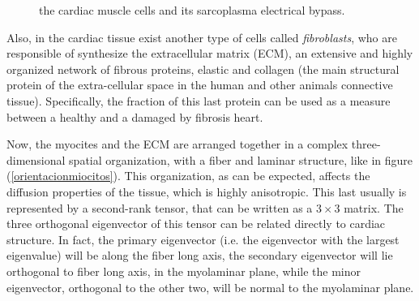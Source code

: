 \documentclass[letterpaper, twoside]{article}     	    %
\begin{document}
\begin{figure}[H]
\centering
{}
\caption{the cardiac muscle cells and its sarcoplasma electrical bypass.} 
\end{figure}

Also, in the cardiac tissue exist another type of cells called \textsl{fibroblasts}, who are responsible of synthesize the extracellular matrix (ECM), an extensive and highly organized network of fibrous proteins, elastic and collagen (the main structural protein of the extra-cellular space in the human and other animals connective tissue). Specifically, the fraction of this last protein can be used as a measure between a healthy and a damaged by fibrosis heart. 

Now, the myocites and the ECM are arranged together in a complex three-dimensional spatial organization, with a fiber and laminar structure, like in figure (\ref{orientacionmiocitos}). This organization, as can be expected, affects the diffusion properties of the tissue, which is highly anisotropic. This last usually is represented by a second-rank tensor, that can be written as a $3 \times 3$ matrix. The three orthogonal eigenvector of this tensor can be related directly to cardiac structure. In fact, the primary eigenvector (i.e. the eigenvector with the largest eigenvalue) will be along the fiber long axis, the secondary eigenvector will lie orthogonal to fiber long axis, in the myolaminar plane, while the minor eigenvector, orthogonal to the other two, will be normal to the myolaminar plane.
\end{document}
